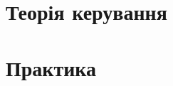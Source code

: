 \documentclass[a5paper,12pt,oneside,ukrainian]{book}
\begin{document}
\tableofcontents
\chapter{Теорія керування}

\chapter{Практика}

\end{document}

